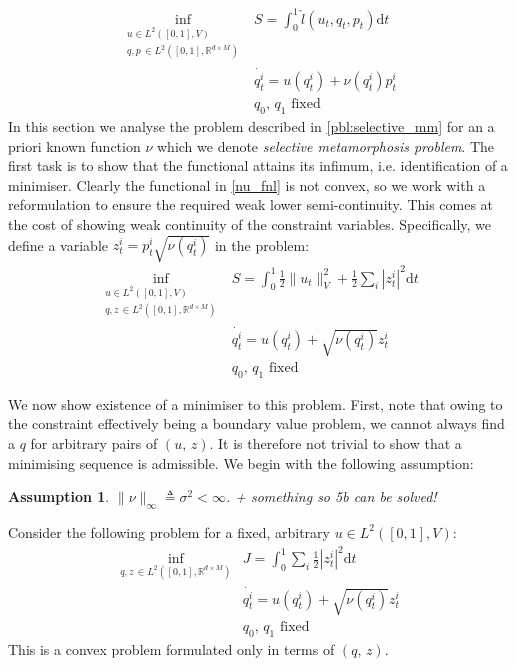 \documentclass{article}
\newtheorem{assumption}{Assumption}
\newcommand{\half}{\frac 12}
\newcommand{\norm}[2]{\| #1 \|_{ #2 }}
\newcommand{\vnorm}[1]{\norm{ #1 }{V}}
\newcommand{\diff}[1]{\text{d} #1}
\newcommand{\RdM}{\mathbb{R}^{d\times M}}
\begin{document}
\begin{subequations}\label{pbl:selective_mm}
\begin{align}
\inf_{\substack{u \in L^2([0,1],V)\\ q, p\, \in L^2([0,1],\RdM)}} & S = \int_0^1 \hat l(u_t, q_t, p_t)\diff{t}\label{nu_fnl}\\
& \dot{q_t^i} =  u(q_t^i) + \nu(q^i_t)p^i_t \\
    & q_0,\,q_1\text{ fixed}
\end{align}
\end{subequations}
In this section we analyse the problem described in \eqref{pbl:selective_mm} for
an a priori known function $\nu$ which we denote \emph{selective metamorphosis
problem}. The first task is to show that the functional attains its infimum,
i.e. identification of a minimiser. Clearly the functional in \eqref{nu_fnl} is
not convex, so we work with a reformulation to ensure the required weak lower
semi-continuity. This comes at the cost of showing weak continuity of the
constraint variables. Specifically, we define a variable $z^i_t = p^i_t
\sqrt{\nu(q_t^i)}$ in the problem:
\begin{subequations}\label{pbl:reformulation}
\begin{align}
\inf_{\substack{u \in L^2([0,1],V)\\ q, z\, \in L^2([0,1],\RdM)}}
    & S = \int_0^1 \half\vnorm{u_t}^2 + \half\sum_i |z_t^i|^2 \diff{t}\\
    & \dot{q_t^i} = u(q_t^i) + \sqrt{\nu(q_t^i)} z^i_t\\
    & q_0,\,q_1\text{ fixed}
\end{align}
\end{subequations}

We now show existence of a minimiser to this problem. First, note that owing to
the constraint effectively being a boundary value problem, we cannot always find
a $q$ for arbitrary pairs of $(u,\,z)$. It is therefore not trivial to show that
a minimising sequence is admissible. We begin with the following assumption:
\begin{assumption}\label{assumption:nu_bounded}
$\|\nu\|_\infty \triangleq \sigma^2 <\infty$. + something so 5b can be solved!
\end{assumption}

Consider the following problem for a fixed,
arbitrary $u\in L^2([0,1], V)$:
\begin{subequations}\label{pbm:nonlinear_inner}
\begin{align}
\inf_{q, z\, \in L^2([0,1],\RdM)}
    & J = \int_0^1 \sum_i \half |z_t^i|^2 \diff{t}\\
    & \dot{q_t^i} = u(q_t^i) + \sqrt{\nu(q_t^i)} z^i_t\\
    & q_0,\,q_1\text{ fixed}
\end{align}
\end{subequations}
This is a convex problem formulated only in terms of $(q,\,z)$.\\
\end{document}
